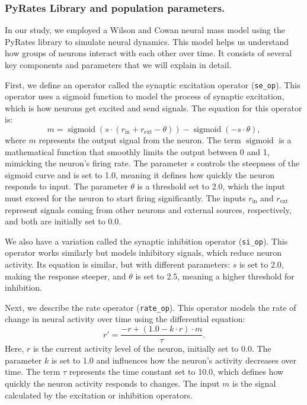 \documentclass[12pt]{article}
\begin{document}
\subsubsection{PyRates Library and population parameters.}
In our study, we employed a Wilson and Cowan neural mass model using the PyRates library to simulate neural dynamics. This model helps us understand how groups of neurons interact with each other over time. It consists of several key components and parameters that we will explain in detail.

First, we define an operator called the synaptic excitation operator (\texttt{se\_op}). This operator uses a sigmoid function to model the process of synaptic excitation, which is how neurons get excited and send signals. The equation for this operator is:
\[
m = \operatorname{sigmoid}(s \cdot (r_{\mathrm{in}} + r_{\mathrm{ext}} - \theta)) - \operatorname{sigmoid}(-s \cdot \theta),
\]
where \( m \) represents the output signal from the neuron. The term \(\operatorname{sigmoid}\) is a mathematical function that smoothly limits the output between 0 and 1, mimicking the neuron's firing rate. The parameter \( s \) controls the steepness of the sigmoid curve and is set to 1.0, meaning it defines how quickly the neuron responds to input. The parameter \(\theta\) is a threshold set to 2.0, which the input must exceed for the neuron to start firing significantly. The inputs \( r_{\mathrm{in}} \) and \( r_{\mathrm{ext}} \) represent signals coming from other neurons and external sources, respectively, and both are initially set to 0.0.

We also have a variation called the synaptic inhibition operator (\texttt{si\_op}). This operator works similarly but models inhibitory signals, which reduce neuron activity. Its equation is similar, but with different parameters: \( s \) is set to 2.0, making the response steeper, and \( \theta \) is set to 2.5, meaning a higher threshold for inhibition.

Next, we describe the rate operator (\texttt{rate\_op}). This operator models the rate of change in neural activity over time using the differential equation:
\[
r' = \frac{-r + (1.0 - k \cdot r) \cdot m}{\tau}.
\]
Here, \( r \) is the current activity level of the neuron, initially set to 0.0. The parameter \( k \) is set to 1.0 and influences how the neuron's activity decreases over time. The term \( \tau \) represents the time constant set to 10.0, which defines how quickly the neuron activity responds to changes. The input \( m \) is the signal calculated by the excitation or inhibition operators.
\end{document}
